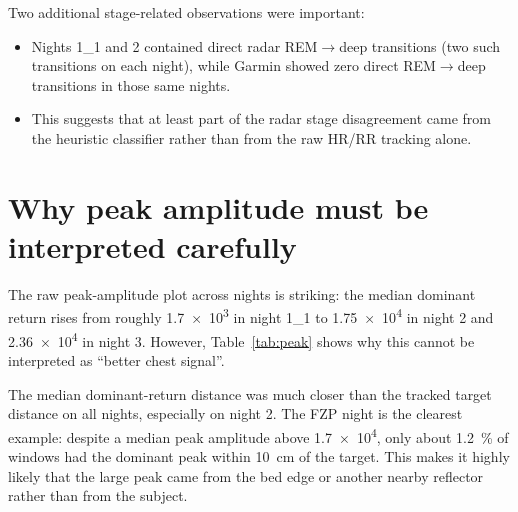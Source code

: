 \documentclass[11pt,a4paper]{article}
\begin{document}
Two additional stage-related observations were important:
\begin{itemize}
    \item Nights 1\_1 and 2 contained direct radar REM$\rightarrow$deep transitions (two such transitions on each night), while Garmin showed zero direct REM$\rightarrow$deep transitions in those same nights.
    \item This suggests that at least part of the radar stage disagreement came from the heuristic classifier rather than from the raw HR/RR tracking alone.
\end{itemize}

\section{Why peak amplitude must be interpreted carefully}
The raw peak-amplitude plot across nights is striking: the median dominant return rises from roughly \num{1.7e3} in night 1\_1 to \num{1.75e4} in night 2 and \num{2.36e4} in night 3. However, Table~\ref{tab:peak} shows why this cannot be interpreted as ``better chest signal''.

\begin{table}[H]
\centering
\caption{Dominant-return amplitude and target-alignment diagnostics from the gated sleep-vitals CSV files.}
\label{tab:peak}
\end{table}

The median dominant-return distance was much closer than the tracked target distance on all nights, especially on night 2. The FZP night is the clearest example: despite a median peak amplitude above \num{1.7e4}, only about \SI{1.2}{\percent} of windows had the dominant peak within \SI{10}{cm} of the target. This makes it highly likely that the large peak came from the bed edge or another nearby reflector rather than from the subject.
\end{document}
